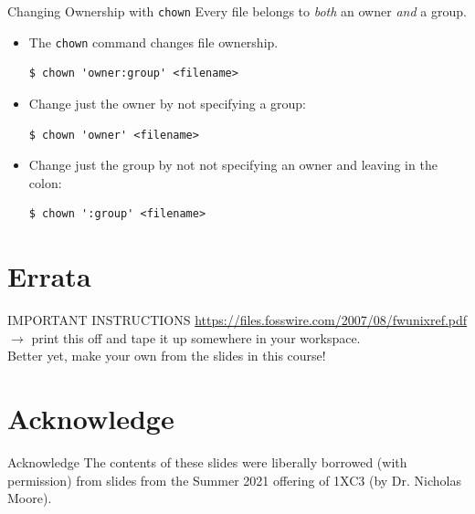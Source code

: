 \documentclass[11pt]{beamer}
\begin{document}
\begin{frame}[fragile=singleslide]{Changing Ownership with \texttt{chown}}
Every file belongs to \emph{both} an owner \emph{and} a group.
\begin{itemize}
\item The \texttt{chown} command changes file ownership.
\begin{lstlisting}[style=terminal]
$ chown 'owner:group' <filename>
\end{lstlisting}
\item Change just the owner by not specifying a group:
\begin{lstlisting}[style=terminal]
$ chown 'owner' <filename>
\end{lstlisting}
\item Change just the group by not not specifying an owner and leaving in the colon:
\begin{lstlisting}[style=terminal]
$ chown ':group' <filename>
\end{lstlisting}
\end{itemize}
\end{frame}

\section[Errata]{Errata}
\begin{frame}{IMPORTANT INSTRUCTIONS}
\url{https://files.fosswire.com/2007/08/fwunixref.pdf} $\rightarrow$ print this off and tape it up somewhere in your workspace. \\
Better yet, make your own from the slides in this course! 
\end{frame}


\section[Acknowledge]{Acknowledge}
\begin{frame}{Acknowledge}
\center
\vspace{8em}
The contents of these slides were liberally borrowed (with permission) from slides from the Summer 2021 offering of 1XC3 (by Dr. Nicholas Moore).  
\end{frame}
\end{document}
